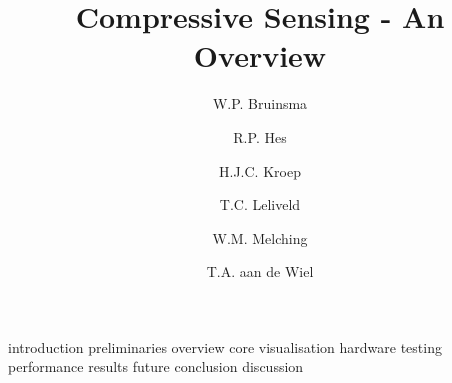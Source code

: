 \documentclass[a4paper, openany, oneside]{memoir}
\title{Compressive Sensing - An Overview}
\author{W.P. Bruinsma \and R.P. Hes \and H.J.C. Kroep \and T.C. Leliveld \and W.M. Melching \and T.A. aan de Wiel}
\begin{document}
{introduction}
{preliminaries}
{overview}
{core}
{visualisation}
{hardware}
{testing}
{performance}
{results}
{future}
{conclusion}
{discussion}
\end{document}
